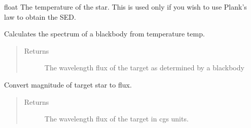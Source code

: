 \documentclass[letterpaper,10pt,english]{sphinxmanual}
\begin{document}
\begin{fulllineitems}
\begin{fulllineitems}
\end{fulllineitems}


\begin{fulllineitems}
\label{\detokenize{modules:signal_to_noise.Target.temp}}
float
The temperature of the star. This is used only if you wish to
use Plank’s law to obtain the SED.

\end{fulllineitems}


\begin{fulllineitems}
\label{\detokenize{modules:signal_to_noise.Target.blackbody_lambda}}
Calculates the spectrum of a blackbody from temperature temp.
\begin{quote}\begin{description}
\item[{Returns}] \leavevmode
The wavelength flux of the target as determined by a blackbody

\end{description}\end{quote}

\end{fulllineitems}


\begin{fulllineitems}
\label{\detokenize{modules:signal_to_noise.Target.convert_to_flux}}
Convert magnitude of target star to flux.
\begin{quote}\begin{description}
\item[{Returns}] \leavevmode
The wavelength flux of the target in cgs units.

\end{description}\end{quote}

\end{fulllineitems}


\end{fulllineitems}




\renewcommand{\indexname}{Index}
\printindex
\end{document}

